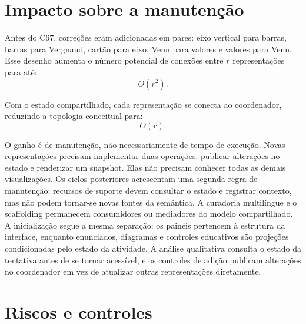 \documentclass[12pt,a4paper]{article}
\begin{document}
\section{Impacto sobre a manutenção}

Antes do C67, correções eram adicionadas em pares: eixo vertical para barras, barras para Vergnaud, cartão para eixo, Venn para valores e valores para Venn. Esse desenho aumenta o número potencial de conexões entre $r$ representações para até:
\[
O(r^2).
\]

Com o estado compartilhado, cada representação se conecta ao coordenador, reduzindo a topologia conceitual para:
\[
O(r).
\]

O ganho é de manutenção, não necessariamente de tempo de execução. Novas representações precisam implementar duas operações: publicar alterações no estado e renderizar um snapshot. Elas não precisam conhecer todas as demais visualizações. Os ciclos posteriores acrescentam uma segunda regra de manutenção: recursos de suporte devem consultar o estado e registrar contexto, mas não podem tornar-se novas fontes da semântica. A curadoria multilíngue e o scaffolding permanecem consumidores ou mediadores do modelo compartilhado. A inicialização segue a mesma separação: os painéis pertencem à estrutura da interface, enquanto enunciados, diagramas e controles educativos são projeções condicionadas pelo estado da atividade. A análise qualitativa consulta o estado da tentativa antes de se tornar acessível, e os controles de adição publicam alterações no coordenador em vez de atualizar outras representações diretamente.

\section{Riscos e controles}
\end{document}
